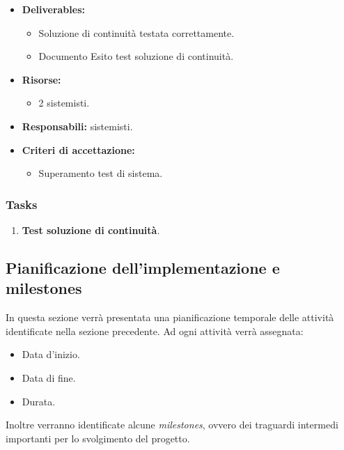                 \begin{itemize}
               		\item  \textbf{Deliverables:} 
                    \begin{itemize}
                    	\item Soluzione di continuità testata correttamente.
                        \item Documento Esito test soluzione di continuità.
					\end{itemize}    
                    \item  \textbf{Risorse:} 
                	\begin{itemize}
                		\item 2 sistemisti.
                	\end{itemize}
                    \item  \textbf{Responsabili:} sistemisti.
                    \item  \textbf{Criteri di accettazione:} 
                    \begin{itemize}
                    	\item Superamento test di sistema.
                    \end{itemize}
                	\end{itemize}
                    
					\subsubsection*{Tasks}
                    \begin{enumerate}
                    	\item \textbf{Test soluzione di continuità}.
                    \end{enumerate}
                    
                    
		\subsection{Pianificazione dell'implementazione e milestones}
        	In questa sezione verrà presentata una pianificazione temporale delle attività identificate nella sezione precedente. Ad ogni attività verrà assegnata:
            \begin{itemize}
            	\item Data d'inizio.
                \item Data di fine.
                \item Durata.
            \end{itemize}
            Inoltre verranno identificate alcune \textit{milestones}, ovvero dei traguardi intermedi importanti per lo svolgimento del progetto.
            
